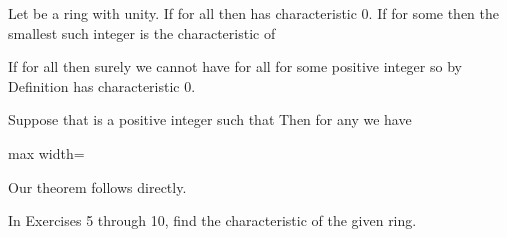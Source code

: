 \documentclass[11pt,oneside]{article}
\begin{document}
\begin{BookBody}
 Let  be a ring with unity. If  for all  then  has characteristic 0. If  for some  then the smallest such integer  is the characteristic of 

 If  for all  then surely we cannot have  for all  for some positive integer  so by Definition  has characteristic 0.

Suppose that  is a positive integer such that  Then for any  we have

\begin{center}\begin{adjustbox}{max width=\linewidth}\end{adjustbox}\end{center}

\noindent Our theorem follows directly. \BookEnd{\blacklozenge}

\end{BookBody}

\BookNarrativefalse

\begin{BookBody}

 \BookEnd{\blacksquare}






\noindent In Exercises 5 through 10, find the characteristic of the given ring.







\end{BookBody}
\end{document}
